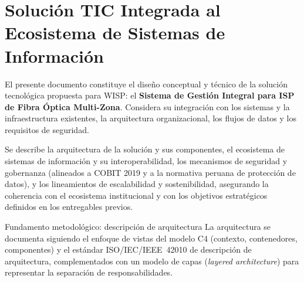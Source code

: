 \chapter{Solución TIC Integrada al Ecosistema de Sistemas de Información}
\label{chap:soluciontic}



El presente documento constituye el diseño conceptual y técnico de la solución
tecnológica propuesta para WISP: el \textbf{Sistema de Gestión Integral para ISP de
Fibra Óptica Multi-Zona}. Considera su integración con los sistemas y la
infraestructura existentes, la arquitectura organizacional, los flujos de datos y los
requisitos de seguridad.

Se describe la arquitectura de la solución y sus componentes, el ecosistema de
sistemas de información y su interoperabilidad, los mecanismos de seguridad y
gobernanza (alineados a COBIT 2019 y a la normativa peruana de protección de datos),
y los lineamientos de escalabilidad y sostenibilidad, asegurando la coherencia con el
ecosistema institucional y con los objetivos estratégicos definidos en los
entregables previos.

\begin{upeubox}{Fundamento metodológico: descripción de arquitectura}
La arquitectura se documenta siguiendo el enfoque de vistas del modelo C4 (contexto,
contenedores, componentes) y el estándar ISO/IEC/IEEE~42010 de descripción de
arquitectura, complementados con un modelo de capas (\textit{layered architecture})
para representar la separación de responsabilidades.
\end{upeubox}

